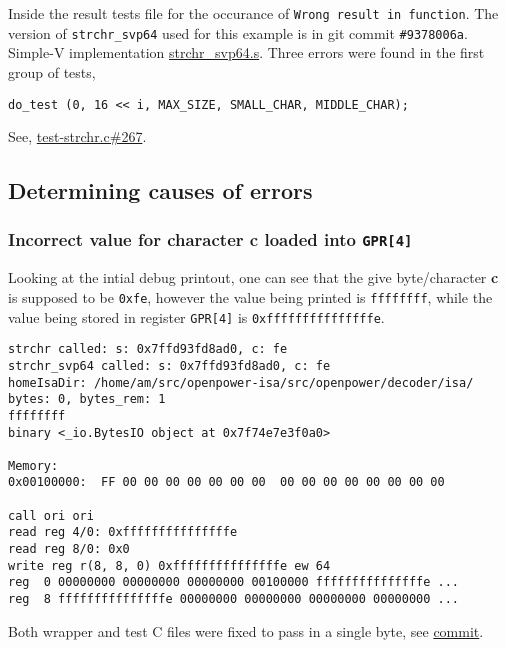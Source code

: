Inside the result tests file for the occurance of
\texttt{Wrong result in function}.
The version of \texttt{strchr\_svp64} used for this example is in git commit
\texttt{\#9378006a}. Simple-V implementation
\href{https://git.vantosh.com/ngisearch/glibc-svp64/src/commit/9378006a84bdef6af85eb0f810fb62fedc62c588/svp64-port/svp64/strchr_svp64.s}{strchr\_svp64.s}.
Three errors were found in the first group of tests,
\begin{verbatim}
do_test (0, 16 << i, MAX_SIZE, SMALL_CHAR, MIDDLE_CHAR);
\end{verbatim}

See,
\href{https://git.vantosh.com/ngisearch/glibc-svp64/src/commit/9378006a84bdef6af85eb0f810fb62fedc62c588/svp64-port/test-strchr.c#L267}{test-strchr.c\#267}.

\subsection{Determining causes of errors}
\label{subsec:determine_cause_err}

\subsubsection{Incorrect value for character \textbf{c} loaded into \texttt{GPR[4]}}

Looking at the intial debug printout, one can see that the give byte/character
\textbf{c} is supposed to be \texttt{0xfe}, however the value being printed
is \texttt{ffffffff}, while the value being stored in register \texttt{GPR[4]}
is \texttt{0xfffffffffffffffe}.

\begin{verbatim}
strchr called: s: 0x7ffd93fd8ad0, c: fe
strchr_svp64 called: s: 0x7ffd93fd8ad0, c: fe
homeIsaDir: /home/am/src/openpower-isa/src/openpower/decoder/isa/
bytes: 0, bytes_rem: 1
ffffffff
binary <_io.BytesIO object at 0x7f74e7e3f0a0>

Memory:
0x00100000:  FF 00 00 00 00 00 00 00  00 00 00 00 00 00 00 00

call ori ori
read reg 4/0: 0xfffffffffffffffe
read reg 8/0: 0x0
write reg r(8, 8, 0) 0xfffffffffffffffe ew 64
reg  0 00000000 00000000 00000000 00100000 fffffffffffffffe ...
reg  8 fffffffffffffffe 00000000 00000000 00000000 00000000 ...
\end{verbatim}

Both wrapper and test C files were fixed to pass in a single byte, see
\href{https://git.vantosh.com/ngisearch/glibc-svp64/commit/8f1b25340ee2f108027a6f50e365d42aeb7cc939}{commit}.

